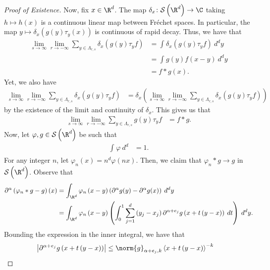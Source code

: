 \documentclass[10pt]{mypackage}
\begin{document}
\begin{proof}[Proof of Existence]
  Now, fix $x\in \R^d$. The map $\delta_x\colon \mathcal{S}\left( \R^d \right)\to \C$ taking $h\mapsto h(x)$ is a continuous linear map between Fréchet spaces. In particular, the map $y\mapsto \delta_x\left( g(y)\tau_y(x) \right)$ is continuous of rapid decay. Thus, we have that
  \begin{align*}
    \lim_{s\to\infty}\lim_{r\to -\infty} \sum_{y\in \Lambda_{r,s}}\delta_x\left( g(y)\tau_yf \right) &= \int_{}^{} \delta_x\left( g(y)\tau_yf \right)\:d^{d}y\\
              &= \int_{}^{} g(y)f\left( x-y \right)\:d^{d}y\\
              &= f\ast g(x).
  \end{align*}
  Yet, we also have
  \begin{align*}
    \lim_{s\to\infty}\lim_{r\to -\infty} \sum_{y\in \Lambda_{r,s}}\delta_x\left( g(y)\tau_yf \right) &= \delta_x\left( \lim_{s\to\infty}\lim_{r\to -\infty} \sum_{y\in \Lambda_{r,s}}\delta_x\left( g(y)\tau_yf \right) \right)
  \end{align*}
  by the existence of the limit and continuity of $\delta_x$. This gives us that
  \begin{align*}
    \lim_{s\to\infty}\lim_{r\to-\infty} \sum_{y\in \Lambda_{r,s}}g(y)\tau_yf &= f\ast g.
  \end{align*}
 Now, let $\varphi,g\in \mathcal{S}\left( \R^d \right)$ be such that
 \begin{align*}
   \int_{}^{} \varphi\:d^{d} &= 1.
 \end{align*}
 For any integer $n$, let $\varphi_n(x) = n^{d}\varphi\left( nx \right)$. Then, we claim that $\varphi_n\ast g \to g$ in $\mathcal{S}\left( \R^d \right)$. Observe that
 \begin{align*}
   \partial^{\alpha}\left( \varphi_n\ast g- g \right)(x) &= \int_{\R^d}^{} \varphi_n\left( x-y \right)\left( \partial^{\alpha}g(y)-\partial^{\alpha}g(x) \right)\:d^{d}y\\
                                           &= \int_{\R^d}^{} \varphi_n\left( x-y \right)\left( \int_{0}^{1} \sum_{j=1}^{d}\left( y_j-x_j \right)\partial^{\alpha + e_j}g\left( x + t\left( y-x \right) \right)\:dt \right)\:d^{d}y.
 \end{align*}
 Bounding the expression in the inner integral, we have that
 \begin{align*}
   \left\vert \partial^{\alpha + e_j}g\left( x + t\left( y-x \right) \right) \right\vert &\leq \norm{g}_{\alpha + e_j,k} \left\langle x + t\left( y-x \right) \right\rangle^{-k}
 \end{align*}

\end{proof}
\end{document}
